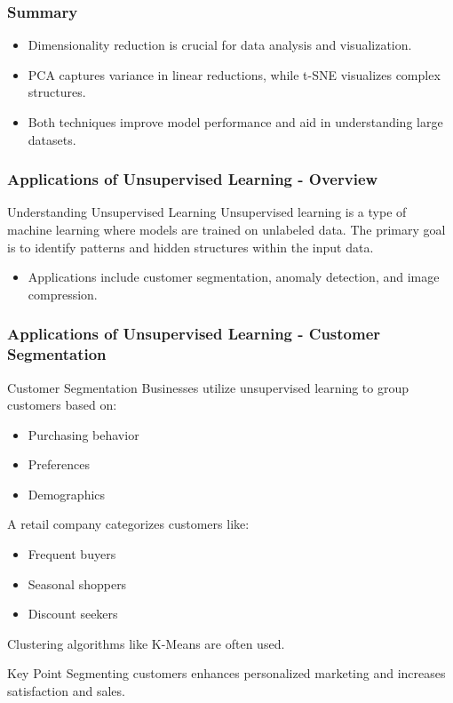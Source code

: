 \documentclass[aspectratio=169]{beamer}
\begin{document}
\begin{frame}[fragile]
    \frametitle{Summary}
    \begin{itemize}
        \item Dimensionality reduction is crucial for data analysis and visualization.
        \item PCA captures variance in linear reductions, while t-SNE visualizes complex structures.
        \item Both techniques improve model performance and aid in understanding large datasets.
    \end{itemize}
\end{frame}

\begin{frame}[fragile]
    \frametitle{Applications of Unsupervised Learning - Overview}
    \begin{block}{Understanding Unsupervised Learning}
        Unsupervised learning is a type of machine learning where models are trained on unlabeled data. The primary goal is to identify patterns and hidden structures within the input data.
    \end{block}
    \begin{itemize}
        \item Applications include customer segmentation, anomaly detection, and image compression.
    \end{itemize}
\end{frame}

\begin{frame}[fragile]
    \frametitle{Applications of Unsupervised Learning - Customer Segmentation}
    \begin{block}{Customer Segmentation}
        Businesses utilize unsupervised learning to group customers based on:
        \begin{itemize}
            \item Purchasing behavior
            \item Preferences
            \item Demographics
        \end{itemize}
    \end{block}
    \begin{example}
        A retail company categorizes customers like:
        \begin{itemize}
            \item Frequent buyers
            \item Seasonal shoppers
            \item Discount seekers
        \end{itemize}
        Clustering algorithms like K-Means are often used.
    \end{example}
    \begin{block}{Key Point}
        Segmenting customers enhances personalized marketing and increases satisfaction and sales.
    \end{block}
\end{frame}
\end{document}
